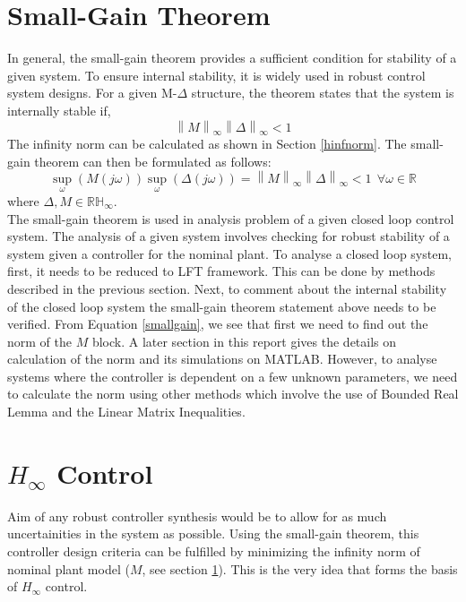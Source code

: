 \documentclass[a4paper,12pt]{article}
\newcommand\norm[1]{\left\lVert#1\right\rVert}
\begin{document}
		\section{Small-Gain Theorem}\label{small-gain} In general, the small-gain theorem provides a sufficient condition for stability of a given system. To ensure internal stability, it is widely used in robust control system designs. For a given M-$\Delta$ structure, the theorem states that the system is internally stable if, 
		\begin{equation}
			\norm{M}_{\infty}\norm{\Delta}_{\infty} < 1
		\end{equation}
		The infinity norm can be calculated as shown in Section \ref{hinfnorm}. The small-gain theorem can then be formulated as follows:
		\begin{equation}
			 \sup_{\omega}(M(j\omega))\sup_{\omega}(\Delta(j\omega)) = \norm{M}_{\infty} \norm{\Delta}_{\infty}< 1 \: \: \forall \omega \in \mathbb{R}
			\label{smallgain}
		\end{equation}
		where $\Delta, M \in \mathbb{RH}_{\infty}$.\\
		The small-gain theorem is used in analysis problem of a given closed loop control system. The analysis of a given system involves checking for robust stability of a system given a controller for the nominal plant. To analyse a closed loop system, first, it needs to be reduced to LFT framework. This can be done by methods described in the previous section. Next, to comment about the internal stability of the closed loop system the small-gain theorem statement above needs to be verified. From Equation \ref{smallgain}, we see that first we need to find out the norm of the $M$ block.  A later section in this report gives the details on calculation of the norm and its simulations on MATLAB. However, to analyse systems where the controller is dependent on a few unknown parameters, we need to calculate the norm using other methods which involve the use of Bounded Real Lemma and the Linear Matrix Inequalities. 
		\section{$H_{\infty}$ Control} 
		\label{hinfcontrol}
		Aim of any robust controller synthesis would be to allow for as much uncertainities in the system as possible. Using the small-gain theorem, this controller design criteria can be fulfilled by minimizing the infinity norm of nominal plant model ($M$, see section \ref{small-gain}). This is the very idea that forms the basis of $H_{\infty}$  control.
\end{document}
